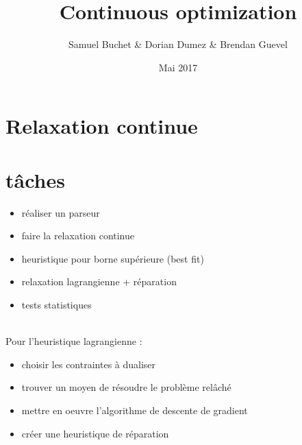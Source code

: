 \documentclass{article}
\title{Continuous optimization}
\author{Samuel Buchet \& Dorian Dumez \& Brendan Guevel}
\date{Mai 2017}
\begin{document}
\maketitle

\section{Relaxation continue}

\section{tâches}

\begin{itemize}
    \item réaliser un parseur
    \item faire la relaxation continue
    \item heuristique pour borne supérieure (best fit)
    \item relaxation lagrangienne + réparation
    \item tests statistiques
\end{itemize}
~\\
Pour l'heuristique lagrangienne :
\begin{itemize}
    \item choisir les contraintes à dualiser
    \item trouver un moyen de résoudre le problème relâché
    \item mettre en oeuvre l'algorithme de descente de gradient
    \item créer une heuristique de réparation
\end{itemize}
\end{document}
